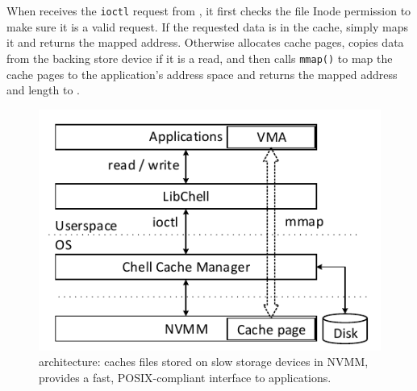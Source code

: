 
When \drv{} receives the \texttt{ioctl} request from \lib{},
it first checks the
file Inode permission to make sure it is a valid request.  If 
the requested data is in the cache, \drv{} simply maps it and returns the mapped
address.
Otherwise \drv{} allocates cache pages, copies data from the backing store
 device if it is a read,
and then calls \texttt{mmap()} to map the cache pages to
the application's address space and returns the mapped address and length
to \lib{}.


\begin{figure}
\includegraphics{Figures/Chell-Stack.pdf}
\caption{\CChell{} architecture: \CChell{} caches files stored on slow storage
devices in NVMM, provides a fast, POSIX-compliant interface to applications.}
\label{fig:CChellstack}
\end{figure}

